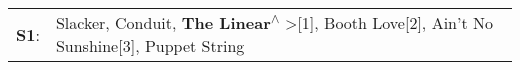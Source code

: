 \begin{supertabular}{p{0.03\textwidth}p{0.92\textwidth}}
 \textbf{S1}:  &  Slacker\textsuperscript{}, \enspace Conduit\textsuperscript{}, \enspace \textbf{The Linear\textsuperscript{$\wedge$}} \textgreater {}[1]\textsuperscript{}, \enspace Booth Love[2]\textsuperscript{}, \enspace Ain't No Sunshine[3]\textsuperscript{}, \enspace Puppet String\textsuperscript{}  \enspace  \\
\end{supertabular}
